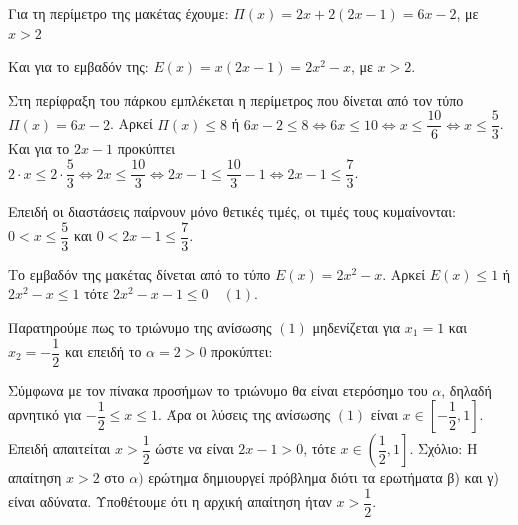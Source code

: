 
\begin{alist}
\item Για τη περίμετρο της μακέτας έχουμε:
$\Pi(x) = 2x + 2(2x - 1) = 6x - 2$, με $x > 2$

Και για το εμβαδόν της:
$E(x) = x(2x - 1) = 2x^2 - x$, με $x > 2$.

\item Στη περίφραξη του πάρκου εμπλέκεται η περίμετρος που δίνεται από τον τύπο
$\Pi(x) = 6x - 2$. Αρκεί $\Pi(x) \le 8$ ή $6x - 2 \le 8 \Leftrightarrow 6x \le 10 \Leftrightarrow x \le \dfrac{10}{6} \Leftrightarrow x \le \dfrac{5}{3}$.
Και για το $2x - 1$ προκύπτει $2 \cdot x \le 2 \cdot \dfrac{5}{3} \Leftrightarrow 2x \le \dfrac{10}{3} \Leftrightarrow 2x - 1 \le \dfrac{10}{3} - 1 \Leftrightarrow 2x - 1 \le \dfrac{7}{3}$.

Επειδή οι διαστάσεις παίρνουν μόνο θετικές τιμές, οι τιμές τους κυμαίνονται:
$0 < x \le \dfrac{5}{3}$ και $0 < 2x - 1 \le \dfrac{7}{3}$.

\item Το εμβαδόν της μακέτας δίνεται από το τύπο $E(x) = 2x^2 - x$.
Αρκεί $E(x) \le 1$ ή $2x^2 - x \le 1$ τότε $2x^2 - x - 1 \le 0 \quad (1)$.

Παρατηρούμε πως το τριώνυμο της ανίσωσης $(1)$ μηδενίζεται για $x_1 = 1$ και $x_2 = -\dfrac{1}{2}$ και
επειδή το $\alpha=2 >0$ προκύπτει:

\begin{center}
\end{center}

Σύμφωνα με τον πίνακα προσήμων το τριώνυμο θα είναι ετερόσημο του $\alpha$, δηλαδή αρνητικό
για $-\dfrac{1}{2} \le x \le 1$.
Άρα οι λύσεις της ανίσωσης $(1)$ είναι $x \in \left[-\dfrac{1}{2}, 1\right]$.
Επειδή απαιτείται $x > \dfrac{1}{2}$ ώστε να είναι $2x - 1 > 0$, τότε $x \in \left(\dfrac{1}{2}, 1\right]$.
Σχόλιο: Η απαίτηση $x>2$ στο $\alpha)$ ερώτημα δημιουργεί πρόβλημα διότι τα ερωτήματα β) και γ) είναι αδύνατα. Υποθέτουμε ότι η αρχική απαίτηση ήταν $x> \dfrac{1}{2}$.
\end{alist}

